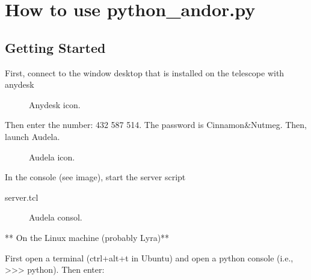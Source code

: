 \documentclass[letterpaper,10pt,english]{sphinxmanual}
\begin{document}
\chapter{How to use python\_andor.py}
\label{\detokenize{start:how-to-use-python-andor-py}}\label{\detokenize{start::doc}}

\section{Getting Started}
\label{\detokenize{start:getting-started}}

First, connect to the window desktop that is installed on the telescope with anydesk

\begin{figure}[htbp]
\centering
\capstart

\noindent{}
\caption{Anydesk icon.}\label{\detokenize{start:id1}}\end{figure}

Then enter the number: 432 587 514. The password is Cinnamon\&Nutmeg. Then, launch Audela.

\begin{figure}[htbp]
\centering
\capstart

\noindent{}
\caption{Audela icon.}\label{\detokenize{start:id2}}\end{figure}

In the console (see image), start the server script

%
\begin{sphinxVerbatim}[commandchars=\\\{\}]
 server.tcl
\end{sphinxVerbatim}

\begin{figure}[htbp]
\centering
\capstart

\noindent{}
\caption{Audela consol.}\label{\detokenize{start:id3}}\end{figure}

** On the Linux machine (probably Lyra)**

First open a terminal (ctrl+alt+t in Ubuntu) and open a python console (i.e., \textgreater{}\textgreater{}\textgreater{} python). Then enter:

%
\begin{sphinxVerbatim}[commandchars=\\\{\}]
     

  
\end{sphinxVerbatim}
\end{document}
